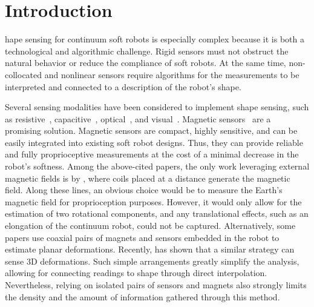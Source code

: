 \section{Introduction}\label{sec:promasens:introduction}
%
%
%
hape sensing for continuum soft robots is especially complex because it is both a technological and algorithmic challenge. Rigid sensors must not obstruct the natural behavior or reduce the compliance of soft robots. At the same time, non-collocated and nonlinear sensors require algorithms for the measurements to be interpreted and connected to a description of the robot's shape.

Several sensing modalities have been considered to implement shape sensing, such as resistive~\citep{shih2019design, kramer2011soft}, capacitive~\citep{scimeca2019model, shintake2018ultrastretchable}, optical~\citep{li2021scaling}, and visual~\citep{rosi2022sensing}. Magnetic sensors~\citep{song2015electromagnetic, ozel2015precise, luo2017toward, guo2019continuum, mitchell2021fast} are a promising solution. Magnetic sensors are compact, highly sensitive, and can be easily integrated into existing soft robot designs. Thus, they can provide reliable and fully proprioceptive measurements at the cost of a minimal decrease in the robot's softness. Among the above-cited papers, the only work leveraging external magnetic fields is by \citet{song2015electromagnetic}, where coils placed at a distance generate the magnetic field.
Along these lines, an obvious choice would be to measure the Earth's magnetic field for proprioception purposes. However, it would only allow for the estimation of two rotational components, and any translational effects, such as an elongation of the continuum robot, could not be captured.
Alternatively, some papers \citep{ozel2015precise,luo2017toward,guo2019continuum} use coaxial pairs of magnets and sensors embedded in the robot to estimate planar deformations. Recently, \citet{mitchell2021fast} has shown that a similar strategy can sense 3D deformations. Such simple arrangements greatly simplify the analysis, allowing for connecting readings to shape through direct interpolation. Nevertheless, relying on isolated pairs of sensors and magnets also strongly limits the density and the amount of information gathered through this method.

